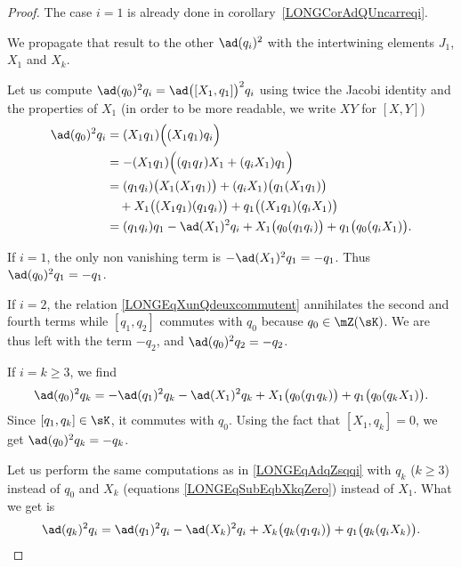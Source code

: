\begin{proof}
	The case $i=1$ is already done in corollary~\ref{LONGCorAdQUncarreqi}.

	We propagate that result to the other $\ad(q_i)^2$ with the intertwining elements $J_1$, $X_1$ and $X_k$.

	Let us compute $\ad(q_0)^2q_i=\ad\big([X_1,q_1]\big)^2q_i$ using twice the Jacobi identity and the properties of $X_1$ (in order to be more readable, we write $XY$ for $[X,Y]$)
	\begin{equation}		\label{LONGEqAdqZsqqi}
		\begin{aligned}[]
			\ad(q_0)^2q_i & =	(X_1q_1)\Big( (X_1q_1)q_i \Big)                                                  \\
			              & =	-(X_1q_1)\Big( (q_1q_I)X_1+(q_iX_1)q_1 \Big)                                     \\
			              & =(q_1q_i)\big( X_1(X_1q_1) \big)+(q_iX_1)\big( q_1(X_1q_1) \big)                  \\
			              & \quad + X_1\big( (X_1q_1)(q_1q_i) \big)+q_1\big( (X_1q_1)(q_iX_1) \big)           \\
			              & =(q_1q_i)q_1-\ad(X_1)^2q_i+X_1\big( q_0(q_1q_i) \big)+q_1\big( q_0(q_iX_1) \big).
		\end{aligned}
	\end{equation}

	If $i=1$, the only non vanishing term is $-\ad(X_1)^2q_1=-q_1$.  Thus $\ad(q_0)^2q_1=-q_1$.

	If $i=2$, the relation \eqref{LONGEqXunQdeuxcommutent} annihilates the second and fourth terms while $[q_1,q_2]$ commutes with $q_0$ because $q_0\in\mZ(\sK)$. We are thus left with the term $-q_2$, and $\ad(q_0)^2q_2=-q_2$.

	If $i=k\geq 3$, we find
	\begin{equation}
		\ad(q_0)^2q_k=-\ad(q_1)^2q_k-\ad(X_1)^2q_k+X_1\big( q_0(q_1q_k) \big)+q_1\big( q_0(q_kX_1) \big).
	\end{equation}
	Since $[q_1,q_k]\in\sK$, it commutes with $q_0$. Using the fact that $[X_1,q_k]=0$, we get $\ad(q_0)^2q_k=-q_k$.

	Let us perform the same computations  as in \eqref{LONGEqAdqZsqqi} with $q_k$ ($k\geq 3$) instead of $q_0$ and $X_k$ (equations \eqref{LONGEqSubEqbXkqZero}) instead of $X_1$. What we get is
	\begin{equation}
		\ad(q_k)^2q_i=\ad(q_1)^2q_i-\ad(X_k)^2q_i+X_k\big( q_k(q_1q_i) \big)+q_1\big( q_k(q_iX_k) \big).
	\end{equation}


\end{proof}
